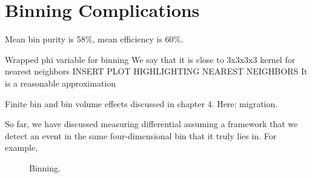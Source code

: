 \section{Binning Complications}

    
    
    Mean bin purity is 58\%, mean efficiency is 60\%. 

    Wrapped phi variable for binning
    We say that it is close to 3x3x3x3 kernel for nearest neighbors
    INSERT PLOT HIGHLIGHTING NEAREST NEIGHBORS
    It is a reasonable approximation
    
    
    Finite bin and bin volume effects discussed in chapter 4. Here: migration. 
    
    So far, we have discussed measuring differential \xsecs assuming a framework that we detect an event in the same four-dimensional bin that it truly lies in. For example,

    \begin{figure}[H]
        \centering
        \hfill
        
        \caption[Binning]{Binning. }\label{fig:mig_ex}
    \end{figure}
    

